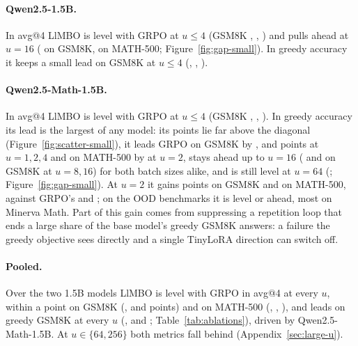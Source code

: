 \documentclass[twoside]{article}
\newcommand{\llmbo}{LlMBO}
\begin{document}
\paragraph{Qwen2.5-1.5B.} In avg@4 \llmbo{} is level with GRPO at $u \le 4$ (GSM8K \gapToneMeanQwenSmallUOneGsm{}, \gapToneMeanQwenSmallUTwoGsm{}, \gapToneMeanQwenSmallUFourGsm{}) and pulls ahead at $u = 16$ (\gapToneMeanQwenSmallUSixteenGsm{} on GSM8K, \gapToneMeanQwenSmallUSixteenMathFive{} on MATH-500; Figure~\ref{fig:gap-small}). In greedy accuracy it keeps a small lead on GSM8K at $u \le 4$ (\gapGreedyGreedyQwenSmallUOneGsm{}, \gapGreedyGreedyQwenSmallUTwoGsm{}, \gapGreedyGreedyQwenSmallUFourGsm{}).

\paragraph{Qwen2.5-Math-1.5B.} In avg@4 \llmbo{} is level with GRPO at $u \le 4$ (GSM8K \gapToneMeanMathSmallUOneGsm{}, \gapToneMeanMathSmallUTwoGsm{}, \gapToneMeanMathSmallUFourGsm{}). In greedy accuracy its lead is the largest of any model: its points lie far above the diagonal (Figure~\ref{fig:scatter-small}), it leads GRPO on GSM8K by \gapGreedyGreedyMathSmallUOneGsm{}, \gapGreedyGreedyMathSmallUTwoGsm{} and \gapGreedyGreedyMathSmallUFourGsm{} points at $u = 1, 2, 4$ and on MATH-500 by \gapGreedyGreedyMathSmallUTwoMathFive{} at $u = 2$, stays ahead up to $u = 16$ (\gapGreedyGreedyMathSmallUEightGsm{} and \gapGreedyGreedyMathSmallUSixteenGsm{} on GSM8K at $u = 8, 16$) for both batch sizes alike, and is still level at $u = 64$ (\gapGreedyGreedyMathSmallUSixtyFourGsm{}; Figure~\ref{fig:gap-small}). At $u = 2$ it gains \gainGreedyGreedyMathSmallUTwoGsm{} points on GSM8K and \gainGreedyGreedyMathSmallUTwoMathFive{} on MATH-500, against GRPO's \gainGrpoGreedyMathSmallUTwoGsm{} and \gainGrpoGreedyMathSmallUTwoMathFive{}; on the OOD benchmarks it is level or ahead, most on Minerva Math. Part of this gain comes from suppressing a repetition loop that ends a large share of the base model's greedy GSM8K answers: a failure the greedy objective sees directly and a single TinyLoRA direction can switch off.

\paragraph{Pooled.} Over the two 1.5B models \llmbo{} is level with GRPO in avg@4 at every $u$, within a point on GSM8K (\poolToneMeanUOneGsmSmall{}, \poolToneMeanUTwoGsmSmall{} and \poolToneMeanUFourGsmSmall{} points) and on MATH-500 (\poolToneMeanUOneMathFiveSmall{}, \poolToneMeanUTwoMathFiveSmall{}, \poolToneMeanUFourMathFiveSmall{}), and leads on greedy GSM8K at every $u$ (\poolGreedyGreedyUOneGsmSmall{}, \poolGreedyGreedyUTwoGsmSmall{} and \poolGreedyGreedyUFourGsmSmall{}; Table~\ref{tab:ablations}), driven by Qwen2.5-Math-1.5B. At $u \in \{64, 256\}$ both metrics fall behind (Appendix~\ref{sec:large-u}).
\end{document}
